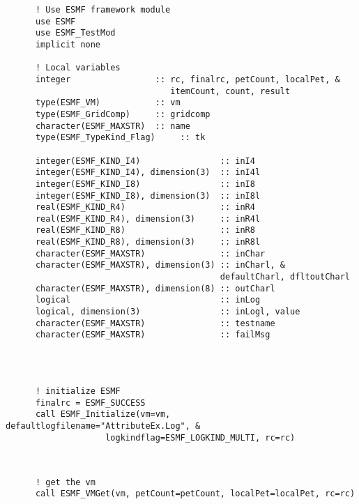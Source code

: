  \begin{verbatim}
      ! Use ESMF framework module
      use ESMF
      use ESMF_TestMod
      implicit none

      ! Local variables  
      integer                 :: rc, finalrc, petCount, localPet, &
                                 itemCount, count, result
      type(ESMF_VM)           :: vm
      type(ESMF_GridComp)     :: gridcomp
      character(ESMF_MAXSTR)  :: name
      type(ESMF_TypeKind_Flag)     :: tk

      integer(ESMF_KIND_I4)                :: inI4
      integer(ESMF_KIND_I4), dimension(3)  :: inI4l
      integer(ESMF_KIND_I8)                :: inI8
      integer(ESMF_KIND_I8), dimension(3)  :: inI8l
      real(ESMF_KIND_R4)                   :: inR4
      real(ESMF_KIND_R4), dimension(3)     :: inR4l
      real(ESMF_KIND_R8)                   :: inR8
      real(ESMF_KIND_R8), dimension(3)     :: inR8l
      character(ESMF_MAXSTR)               :: inChar
      character(ESMF_MAXSTR), dimension(3) :: inCharl, &
                                           defaultCharl, dfltoutCharl
      character(ESMF_MAXSTR), dimension(8) :: outCharl
      logical                              :: inLog
      logical, dimension(3)                :: inLogl, value
      character(ESMF_MAXSTR)               :: testname
      character(ESMF_MAXSTR)               :: failMsg
 
\end{verbatim}
 

 \begin{verbatim}

      
      ! initialize ESMF
      finalrc = ESMF_SUCCESS
      call ESMF_Initialize(vm=vm, defaultlogfilename="AttributeEx.Log", &
                    logkindflag=ESMF_LOGKIND_MULTI, rc=rc)
 
\end{verbatim}
 

 \begin{verbatim}
      
      ! get the vm
      call ESMF_VMGet(vm, petCount=petCount, localPet=localPet, rc=rc)
 
\end{verbatim}
 


